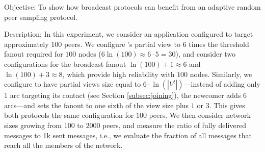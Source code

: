 \begin{asparadesc}
\item [Objective:] To show how broadcast protocols can benefit from
  an adaptive random peer sampling protocol.
\item [Description:] 
  In this experiment, we consider an application configured to target
  approximately $100$ peers. 
  We configure \CYCLON's partial view to $6$ times the threshold fanout required
  for $100$ nodes ($6 \ln(100) \approx 6 \cdot 5 = 30$), and consider two
  configurations for the broadcast fanout $\ln(100)+1 \approx 6 $ and
  $\ln(100)+3 \approx 8$, which provide high reliability with $100$
  nodes. Similarly, we configure \SPRAY to have partial views size equal to
  $6 \cdot \ln(|V^t|)$---instead of adding only 1 arc targeting its contact (see
  Section \ref{subsec:joining}), the newcomer adds 6 arcs---and sets the fanout
  to one sixth of the view size plus $1$ or $3$. This gives both protocols the
  same configuration for $100$ peers.  We then consider network sizes growing
  from $100$ to $2000$ peers, and measure the ratio of fully delivered messages
  to 1k sent messages, i.e., we evaluate the fraction of all messages that reach
  all the members of the network.


\end{asparadesc}
